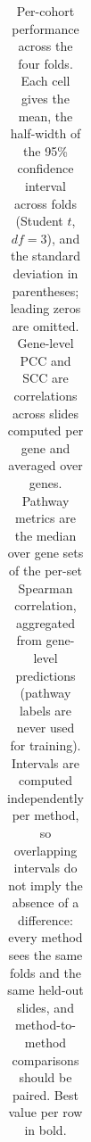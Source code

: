 \begin{table}
\begin{tabular}{lccccccccccccccc}
\bottomrule
\end{tabular}
\caption{Per-cohort performance across the four folds. Each cell gives the mean, the half-width of the 95\% confidence interval across folds (Student $t$, $df=3$), and the standard deviation in parentheses; leading zeros are omitted. Gene-level PCC and SCC are correlations across slides computed per gene and averaged over genes. Pathway metrics are the median over gene sets of the per-set Spearman correlation, aggregated from gene-level predictions (pathway labels are never used for training). Intervals are computed independently per method, so overlapping intervals do not imply the absence of a difference: every method sees the same folds and the same held-out slides, and method-to-method comparisons should be paired. Best value per row in bold.}
\label{tab:appendix-full}
\end{table}

